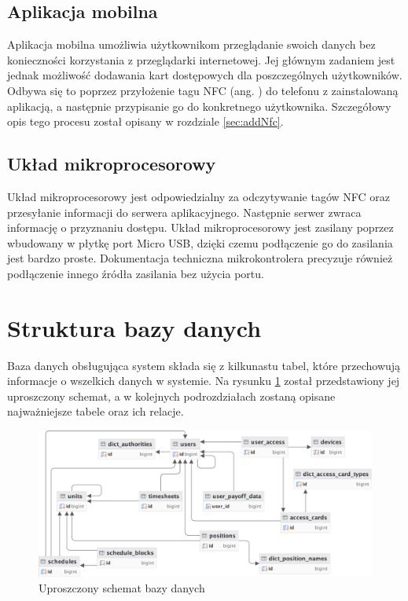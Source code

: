 \subsection{Aplikacja mobilna}

Aplikacja mobilna umożliwia użytkownikom przeglądanie swoich danych bez konieczności korzystania z przeglądarki internetowej. Jej głównym zadaniem jest jednak możliwość dodawania kart dostępowych dla poszczególnych użytkowników. Odbywa się to poprzez przyłożenie tagu NFC (ang. ) do telefonu z zainstalowaną aplikacją, a następnie przypisanie go do konkretnego użytkownika. Szczegółowy opis tego procesu został opisany w rozdziale \ref{sec:addNfc}.

\subsection{Układ mikroprocesorowy}

Układ mikroprocesorowy jest odpowiedzialny za odczytywanie tagów NFC oraz przesyłanie informacji do serwera aplikacyjnego. Następnie serwer zwraca informację o przyznaniu dostępu. Układ mikroprocesorowy jest zasilany poprzez wbudowany w płytkę port Micro USB, dzięki czemu podłączenie go do zasilania jest bardzo proste. Dokumentacja techniczna mikrokontrolera \cite{bib:picoWdatasheet} precyzuje również podłączenie innego źródła zasilania bez użycia portu.

\section{Struktura bazy danych}

Baza danych obsługująca system składa się z kilkunastu tabel, które przechowują informacje o wszelkich danych w systemie. Na rysunku \ref{fig:dbDiagram} został przedstawiony jej uproszczony schemat, a w kolejnych podrozdziałach zostaną opisane najważniejsze tabele oraz ich relacje.

\begin{figure}[H]
    \centering
    \includegraphics[width=\textwidth]{graf/dbDiagram.png}
    \caption{Uproszczony schemat bazy danych}
    \label{fig:dbDiagram}
\end{figure}

